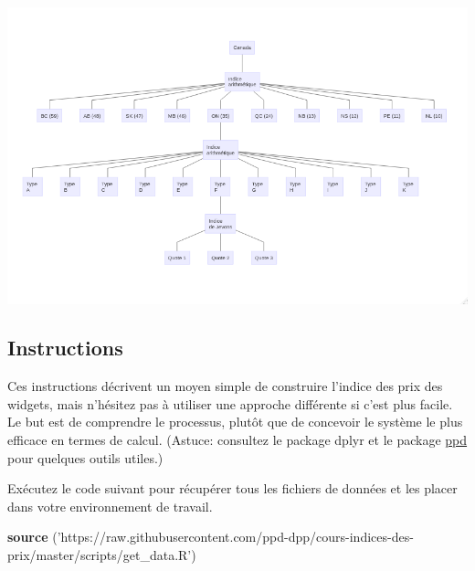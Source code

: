 \documentclass[]{article}
\newenvironment{Shaded}{\begin{snugshade}}{\end{snugshade}}
\newcommand{\KeywordTok}[1]{\textcolor[rgb]{0.13,0.29,0.53}{\textbf{#1}}}
\newcommand{\NormalTok}[1]{#1}
\newcommand{\StringTok}[1]{\textcolor[rgb]{0.31,0.60,0.02}{#1}}
\begin{document}
\includegraphics{img/structure.png}

\hypertarget{instructions}{%
\subsection{Instructions}\label{instructions}}

Ces instructions décrivent un moyen simple de construire l'indice des prix des widgets, mais n'hésitez pas à utiliser une approche différente si c'est plus facile. Le but est de comprendre le processus, plutôt que de concevoir le système le plus efficace en termes de calcul. (Astuce: consultez le package dplyr et le package \href{https://github.com/marberts/ppd}{ppd} pour quelques outils utiles.)

Exécutez le code suivant pour récupérer tous les fichiers de données et les placer dans votre environnement de travail.

\begin{Shaded}
\begin{Highlighting}[]
\KeywordTok{source}\NormalTok{ (}\StringTok{'https://raw.githubusercontent.com/ppd-dpp/cours-indices-des-prix/master/scripts/get_data.R'}\NormalTok{)}
\end{Highlighting}
\end{Shaded}
\end{document}
